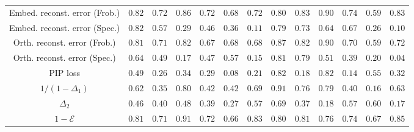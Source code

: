 \begin{table}
\begin{tabular}{c | c | c | c | c | c | c | c | c | c | c | c | c}
		Embed. reconst. error (Frob.) &  $0.82$&$0.72$&$0.86$  &  $0.72$&$0.68$&$0.72$  &  $0.80$&$0.83$&$0.90$ &  $0.74$&$0.59$&$0.83$  \\
		Embed. reconst. error (Spec.) &  $0.82$&$0.57$&$0.29$  &  $0.46$&$0.36$&$0.11$  &  $0.79$&$0.73$&$0.64$  &  $0.67$&$0.26$&$0.10$  \\
		Orth. reconst. error (Frob.) &  $0.81$&$0.71$&$0.82$  &  $0.67$&$0.68$&$0.68$  &  $0.87$&$0.82$&$0.90$  &  $0.70$&$0.59$&$0.72$  \\
		Orth. reconst. error (Spec.) &  $0.64$&$0.49$&$0.17$  &  $0.47$&$0.57$&$0.15$  &  $0.81$&$0.79$&$0.51$  &  $0.39$&$0.20$&$0.04$  \\
		PIP loss &  $0.49$&$0.26$&$0.34$  &  $0.29$&$0.08$&$0.21$  &  $0.82$&$0.18$&$\mathbf{0.82}$  &  $0.14$&$0.55$&$0.32$  \\  
		$1/(1-\Delta_1)$ &  $0.62$&$0.35$&$0.80$  &  $0.42$&$0.42$&$0.69$  &  $\mathbf{0.91}$&$0.76$&$0.79$  &  $0.40$&$0.16$&$0.63$  \\  
		$\Delta_2$ &  $0.46$&$0.40$&$0.48$  &  $0.39$&$0.27$&$0.57$  &  $0.69$&$0.37$&$0.18$  &  $0.57$&$0.60$&$0.17$  \\  
		$1 - \mathcal{E}$ & $\mathbf{0.81}$&$\mathbf{0.71}$&$\mathbf{0.91}$  &  $\mathbf{0.72}$&$\mathbf{0.66}$&$\mathbf{0.83}$  &  $0.80$&$\mathbf{0.81}$&$0.76$  &  $\mathbf{0.74}$&$\mathbf{0.67}$&$\mathbf{0.85}$  \\  
		\bottomrule
	\end{tabular}
	\label{tab:sp_rank}
\end{table}


